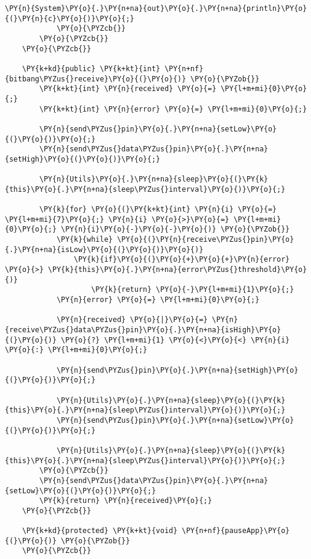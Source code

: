 \begin{Verbatim}[commandchars=\\\{\}]
                \PY{n}{System}\PY{o}{.}\PY{n+na}{out}\PY{o}{.}\PY{n+na}{println}\PY{o}{(}\PY{n}{c}\PY{o}{)}\PY{o}{;}
            \PY{o}{\PYZcb{}}
        \PY{o}{\PYZcb{}}
    \PY{o}{\PYZcb{}}

    \PY{k+kd}{public} \PY{k+kt}{int} \PY{n+nf}{bitbang\PYZus{}receive}\PY{o}{(}\PY{o}{)} \PY{o}{\PYZob{}}
        \PY{k+kt}{int} \PY{n}{received} \PY{o}{=} \PY{l+m+mi}{0}\PY{o}{;}
        \PY{k+kt}{int} \PY{n}{error} \PY{o}{=} \PY{l+m+mi}{0}\PY{o}{;}

        \PY{n}{send\PYZus{}pin}\PY{o}{.}\PY{n+na}{setLow}\PY{o}{(}\PY{o}{)}\PY{o}{;}
        \PY{n}{send\PYZus{}data\PYZus{}pin}\PY{o}{.}\PY{n+na}{setHigh}\PY{o}{(}\PY{o}{)}\PY{o}{;}

        \PY{n}{Utils}\PY{o}{.}\PY{n+na}{sleep}\PY{o}{(}\PY{k}{this}\PY{o}{.}\PY{n+na}{sleep\PYZus{}interval}\PY{o}{)}\PY{o}{;}

        \PY{k}{for} \PY{o}{(}\PY{k+kt}{int} \PY{n}{i} \PY{o}{=} \PY{l+m+mi}{7}\PY{o}{;} \PY{n}{i} \PY{o}{>}\PY{o}{=} \PY{l+m+mi}{0}\PY{o}{;} \PY{n}{i}\PY{o}{-}\PY{o}{-}\PY{o}{)} \PY{o}{\PYZob{}}
            \PY{k}{while} \PY{o}{(}\PY{n}{receive\PYZus{}pin}\PY{o}{.}\PY{n+na}{isLow}\PY{o}{(}\PY{o}{)}\PY{o}{)}
                \PY{k}{if}\PY{o}{(}\PY{o}{+}\PY{o}{+}\PY{n}{error} \PY{o}{>} \PY{k}{this}\PY{o}{.}\PY{n+na}{error\PYZus{}threshold}\PY{o}{)}
                    \PY{k}{return} \PY{o}{-}\PY{l+m+mi}{1}\PY{o}{;}
            \PY{n}{error} \PY{o}{=} \PY{l+m+mi}{0}\PY{o}{;}

            \PY{n}{received} \PY{o}{|}\PY{o}{=} \PY{n}{receive\PYZus{}data\PYZus{}pin}\PY{o}{.}\PY{n+na}{isHigh}\PY{o}{(}\PY{o}{)} \PY{o}{?} \PY{l+m+mi}{1} \PY{o}{<}\PY{o}{<} \PY{n}{i} \PY{o}{:} \PY{l+m+mi}{0}\PY{o}{;}

            \PY{n}{send\PYZus{}pin}\PY{o}{.}\PY{n+na}{setHigh}\PY{o}{(}\PY{o}{)}\PY{o}{;}

            \PY{n}{Utils}\PY{o}{.}\PY{n+na}{sleep}\PY{o}{(}\PY{k}{this}\PY{o}{.}\PY{n+na}{sleep\PYZus{}interval}\PY{o}{)}\PY{o}{;}
            \PY{n}{send\PYZus{}pin}\PY{o}{.}\PY{n+na}{setLow}\PY{o}{(}\PY{o}{)}\PY{o}{;}

            \PY{n}{Utils}\PY{o}{.}\PY{n+na}{sleep}\PY{o}{(}\PY{k}{this}\PY{o}{.}\PY{n+na}{sleep\PYZus{}interval}\PY{o}{)}\PY{o}{;}
        \PY{o}{\PYZcb{}}
        \PY{n}{send\PYZus{}data\PYZus{}pin}\PY{o}{.}\PY{n+na}{setLow}\PY{o}{(}\PY{o}{)}\PY{o}{;}
        \PY{k}{return} \PY{n}{received}\PY{o}{;}
    \PY{o}{\PYZcb{}}

    \PY{k+kd}{protected} \PY{k+kt}{void} \PY{n+nf}{pauseApp}\PY{o}{(}\PY{o}{)} \PY{o}{\PYZob{}}
    \PY{o}{\PYZcb{}}


\end{Verbatim}
